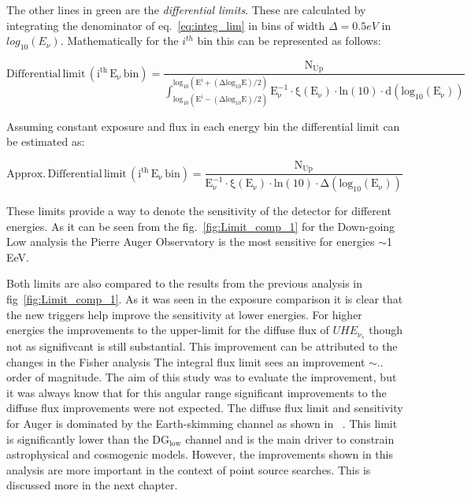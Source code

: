The other lines in green are the \textit{differential limits}. These are calculated by integrating the denominator of eq.~\ref{eq:integ_lim} in bins of width $\Delta = 0.5eV$ in $log_{10}(E_{\nu})$. Mathematically for the $i^{th}$ bin this can be represented as follows:

\begin{equation}
  \label{eq:diff_lim}
  \mathrm{Differential \,limit \, (i^{th} \, E_{\nu} \, bin)  = \frac{N_{Up}}{\int_{log_10(E^i - (\Delta log_{10}E)/2)}^{log_10(E^i + (\Delta log_{10}E)/2)} E^{-1}_{\nu} \cdot \xi(E_{\nu}) \cdot ln(10) \cdot d(log_{10}(E_{\nu}))}}
\end{equation}

Assuming constant exposure and flux in each energy bin the differential limit can be estimated as:

\begin{equation}
  \label{eq:diff_lim_approx}
  \mathrm{Approx. \, Differential \,limit \, (i^{th} \, E_{\nu} \, bin)  = \frac{N_{Up}}{E^{-1}_{\nu} \cdot \xi(E_{\nu}) \cdot ln(10) \cdot \Delta (log_{10}(E_{\nu}))}}
\end{equation}

These limits provide a way to denote the sensitivity of the detector for different energies. As it can be seen from the fig.~\ref{fig:Limit_comp_1} for the Down-going Low analysis the Pierre Auger Observatory is the most sensitive for energies $\sim$1 EeV. 

Both limits are also compared to the results from the previous analysis in fig~\ref{fig:Limit_comp_1}. As it was seen in the exposure comparison it is clear that the new triggers help improve the sensitivity at lower energies. For higher energies the improvements to the upper-limit for the diffuse flux of $UHE_{\nu_s}$ though not as signifivcant is still substantial. This improvement can be attributed to the changes in the Fisher analysis The integral flux limit sees an improvement $\sim$.. order of magnitude. The aim of this study was to evaluate the improvement, but it was always know that for this angular range significant improvements to the diffuse flux improvements were not expected. The diffuse flux limit and sensitivity for Auger is dominated by the Earth-skimming channel as shown in ~\cite{Aab_2019_diffuse}. This limit is significantly lower than the DG$\mathrm{_{low}}$ channel and is the main driver to constrain astrophysical and cosmogenic models. However, the improvements shown in this analysis are more important in the context of point source searches. This is discussed more in the next chapter. 

